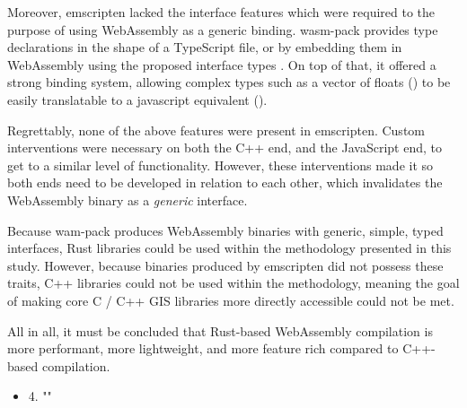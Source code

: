 Moreover, emscripten lacked the interface features which were required to the purpose of using WebAssembly as a generic binding. 
wasm-pack provides type declarations in the shape of a TypeScript file, or by embedding them in WebAssembly using the proposed interface types \citep{wagner_interface_2022}. 
On top of that, it offered a strong binding system, allowing complex types such as a vector of floats () to be easily translatable to a javascript equivalent ().

Regrettably, none of the above features were present in emscripten. 
Custom interventions were necessary on both the C++ end, and the JavaScript end, to get to a similar level of functionality.
However, these interventions made it so both ends need to be developed in relation to each other, which invalidates the  WebAssembly binary as a \emph{generic} interface.

Because wam-pack produces WebAssembly binaries with generic, simple, typed interfaces, Rust libraries could be used within the methodology presented in this study.
However, because binaries produced by emscripten did not possess these traits, C++ libraries could not be used within the methodology, meaning the goal of making core C / C++ GIS libraries more directly accessible could not be met.

All in all, it must be concluded that Rust-based WebAssembly compilation is more performant, more lightweight, and more feature rich compared to C++-based compilation.



\begin{itemize}[ ]
  \item 4. "\myNewSubRQFour"
\end{itemize}

